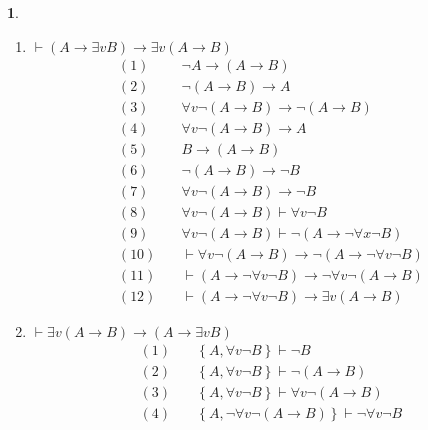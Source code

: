 \documentclass[a4paper, 12pt]{ctexbook} %
\theoremstyle{plain}
\theoremstyle{definition}
\newtheorem{problem}{}
\theoremstyle{remark}
\begin{document}
\begin{problem}
\begin{enumerate}
\item $\vdash (A \to \exists v B ) \to \exists v \left( A \to B \right)$
\begin{align*}
    (1)  \quad & \neg A \to \left(A \to B \right) \tag{PC 定理6}\\ 
    (2)  \quad & \neg \left(A \to B \right) \to A  \tag{逆否命题} \\
    (3)  \quad & \forall  v \neg \left(A \to B \right) \to \neg (A\to B ) \tag{去全称}\\
    (4)  \quad & \forall v \neg \left(A \to B \right) \to A \tag{(2)(3) 三段论}\\ 
    (5)  \quad & B \to  \left(A \to B \right) \tag{A1} \\
    (6)  \quad & \neg \left(A\to B \right) \to \neg B  \tag{逆否命题}\\
    (7)  \quad & \forall  v \neg \left(A \to B \right) \to \neg B \tag{(3)(6)三段}\\
    (8)  \quad & \forall  v \neg \left(A \to B \right) \vdash \forall v \neg B \tag{全称推广}\\
    (9)  \quad & \forall v \neg \left(A \to B \right) \vdash \neg \left(A \to \neg \forall  x \neg B \right) \tag{(4)(8)} \\
    (10) \quad  & \vdash  \forall  v \neg \left(A \to B \right) \to \neg \left(A \to \neg \forall  v \neg B \right) \tag{演绎定理}\\ 
    (11) \quad  & \vdash  \left(A \to \neg \forall  v \neg B \right) \to \neg  \forall  v \neg \left(A \to B \right)  \tag{逆否}\\
    (12) \quad  & \vdash \left(A \to \neg \forall  v \neg B     \right) \to \exists v \left(A \to B \right)
\end{align*}
\item $\vdash \exists v \left(A \to B \right) \to \left(A \to \exists v B \right) $ 
\begin{align*}
    (1)\quad & \left\{ A , \forall  v \neg B  \right\} \vdash \neg B \tag{去全称}\\  
    (2)\quad & \left\{  A  , \forall  v \neg B \right\} \vdash  \neg \left(A \to B \right) \tag{(1) , 已知条件} \\
    (3)\quad & \left\{ A , \forall v \neg B  \right\} \vdash  \forall  v \neg \left(A \to B \right) \tag{全称推广} \\
    (4)\quad & \left\{ A , \neg \forall  v \neg \left(A \to B \right) \right\} \vdash  \neg \forall  v \neg B  \tag{演绎定理和逆否}\\

\end{align*}
\end{enumerate}
\end{problem}
\end{document}

